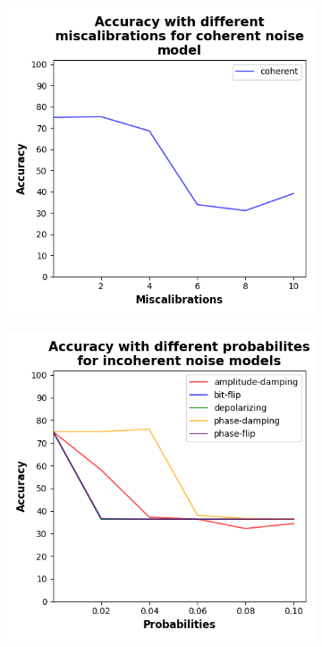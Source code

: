 \begin{figure}[!h]
  \centering

  \begin{subfigure}{0.45\textwidth}
      \includegraphics[width=\linewidth]{figures/evaluation_results/plus-minus/pqc/figures/accuracy-coherent.png}
      \label{fig:pm1}
  \end{subfigure} \qquad
  \begin{subfigure}{0.45\textwidth}
      \includegraphics[width=\linewidth]{figures/evaluation_results/plus-minus/pqc/figures/accuracy-incoherent.png}
      \label{fig:pm2}
  \end{subfigure}


\end{figure}
